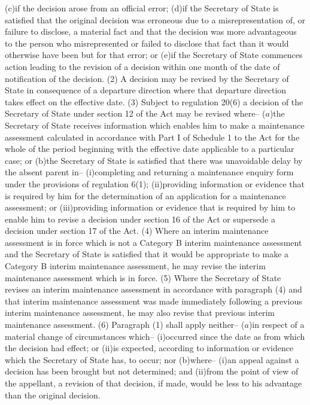 \documentclass[12pt,a4paper]{article}
\begin{document}
(c)if the decision arose from an official error;
(d)if the Secretary of State is satisfied that the original decision was erroneous due to a misrepresentation of, or failure to disclose, a material fact and that the decision was more advantageous to the person who misrepresented or failed to disclose that fact than it would otherwise have been but for that error; or
(e)if the Secretary of State commences action leading to the revision of a decision within one month of the date of notification of the decision.
(2) A decision may be revised by the Secretary of State in consequence of a departure direction where that departure direction takes effect on the effective date.
(3) Subject to regulation 20(6) a decision of the Secretary of State under section 12 of the Act may be revised where–
($a$)the Secretary of State receives information which enables him to make a maintenance assessment calculated in accordance with Part I of Schedule 1 to the Act for the whole of the period beginning with the effective date applicable to a particular case; or
(b)the Secretary of State is satisfied that there was unavoidable delay by the absent parent in–
(i)completing and returning a maintenance enquiry form under the provisions of regulation 6(1);
(ii)providing information or evidence that is required by him for the determination of an application for a maintenance assessment; or
(iii)providing information or evidence that is required by him to enable him to revise a decision under section 16 of the Act or supersede a decision under section 17 of the Act.
(4) Where an interim maintenance assessment is in force which is not a Category B interim maintenance assessment and the Secretary of State is satisfied that it would be appropriate to make a Category B interim maintenance assessment, he may revise the interim maintenance assessment which is in force.
(5) Where the Secretary of State revises an interim maintenance assessment in accordance with paragraph (4) and that interim maintenance assessment was made immediately following a previous interim maintenance assessment, he may also revise that previous interim maintenance assessment.
(6) Paragraph (1) shall apply neither–
($a$)in respect of a material change of circumstances which–
(i)occurred since the date as from which the decision had effect; or
(ii)is expected, according to information or evidence which the Secretary of State has, to occur; nor
(b)where–
(i)an appeal against a decision has been brought but not determined; and
(ii)from the point of view of the appellant, a revision of that decision, if made, would be less to his advantage than the original decision.
\end{document}
